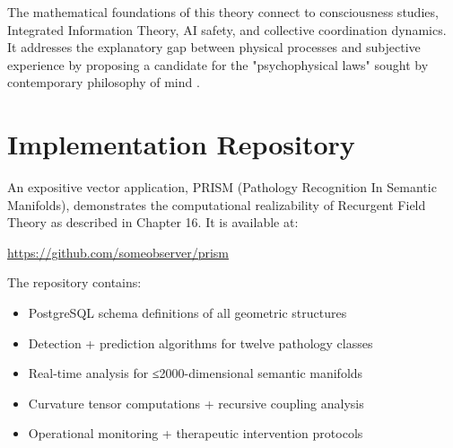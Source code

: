 \documentclass[11pt, a4paper]{report}
\begin{document}
\vspace{1em}

The mathematical foundations of this theory connect to consciousness studies, Integrated Information Theory, AI safety, and collective coordination dynamics. It addresses the explanatory gap between physical processes and subjective experience by proposing a candidate for the "psychophysical laws" sought by contemporary philosophy of mind \autocite{Chalmers1996}.

\tableofcontents

















\appendix
\chapter{Implementation Repository}
\label{appendix:implementation}

An expositive vector application, PRISM (Pathology Recognition In Semantic Manifolds), demonstrates the computational realizability of Recurgent Field Theory as described in Chapter 16. It is available at:

\begin{center}
\url{https://github.com/someobserver/prism}
\end{center}

The repository contains:
\begin{itemize}
\item PostgreSQL schema definitions of all geometric structures
\item Detection + prediction algorithms for twelve pathology classes
\item Real-time analysis for ≤2000-dimensional semantic manifolds
\item Curvature tensor computations + recursive coupling analysis
\item Operational monitoring + therapeutic intervention protocols
\end{itemize}

\printbibliography
\end{document}
